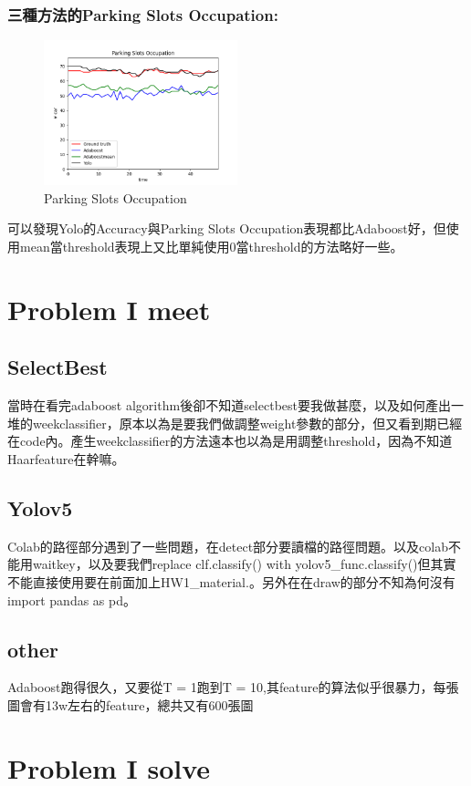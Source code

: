 \documentclass[12,a4paper]{article}
\begin{document}
\subsubsection{三種方法的Parking Slots Occupation:}
\begin{figure}[!ht]
    \centering
    \caption{Parking Slots Occupation}
    \includegraphics[width=0.5\textwidth]{pic/Parking_Slots_Occupation.png}
\end{figure}
\FloatBarrier
可以發現Yolo的Accuracy與Parking Slots Occupation表現都比Adaboost好，但使用mean當threshold表現上又比單純使用0當threshold的方法略好一些。
\section{Problem I meet}
\subsection{SelectBest}
當時在看完adaboost algorithm後卻不知道selectbest要我做甚麼，以及如何產出一堆的weekclassifier，原本以為是要我們做調整weight參數的部分，但又看到期已經在code內。產生weekclassifier的方法遠本也以為是用調整threshold，因為不知道Haarfeature在幹嘛。
\subsection{Yolov5}
Colab的路徑部分遇到了一些問題，在detect部分要讀檔的路徑問題。以及colab不能用waitkey，以及要我們replace clf.classify() with yolov5\_func.classify()但其實不能直接使用要在前面加上HW1\_material.。另外在在draw的部分不知為何沒有import pandas as pd。
\subsection{other}
Adaboost跑得很久，又要從T = 1跑到T = 10,其feature的算法似乎很暴力，每張圖會有13w左右的feature，總共又有600張圖
\section{Problem I solve}
\end{document}
